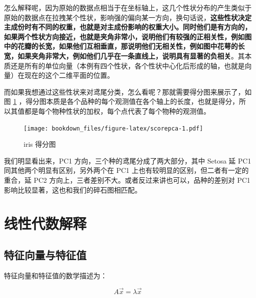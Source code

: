 \documentclass[
]{krantz}
\makeatletter
\newenvironment{Shaded}{\begin{snugshade}}{\end{snugshade}}
\newcommand{\AttributeTok}[1]{\textcolor[rgb]{0.77,0.63,0.00}{#1}}
\newcommand{\ConstantTok}[1]{\textcolor[rgb]{0.00,0.00,0.00}{#1}}
\newcommand{\FunctionTok}[1]{\textcolor[rgb]{0.00,0.00,0.00}{#1}}
\newcommand{\NormalTok}[1]{#1}
\newcommand{\SpecialCharTok}[1]{\textcolor[rgb]{0.00,0.00,0.00}{#1}}
\newenvironment{kframe}{%
\medskip{}
\setlength{\fboxsep}{.8em}
 \def\at@end@of@kframe{}%
 \ifinner\ifhmode%
  \def\at@end@of@kframe{\end{minipage}}%
  \begin{minipage}{\columnwidth}%
 \fi\fi%
 \def\FrameCommand##1{\hskip\@totalleftmargin \hskip-\fboxsep
 \colorbox{shadecolor}{##1}\hskip-\fboxsep
     \hskip-\linewidth \hskip-\@totalleftmargin \hskip\columnwidth}%
 \MakeFramed {\advance\hsize-\width
   \@totalleftmargin\z@ \linewidth\hsize
   \@setminipage}}%
 {\par\unskip\endMakeFramed%
 \at@end@of@kframe}
\renewenvironment{Shaded}{\begin{kframe}}{\end{kframe}}
\makeatother
\begin{document}
怎么解释呢，因为原始的数据点相当于在坐标轴上，这几个性状分布的产生类似于原始的数据点在拉拽某个性状，影响强的偏向某一方向，换句话说，\textbf{这些性状决定主成份时有不同的权重，也就是对主成份影响的权重大小。同时他们是有方向的，如果两个性状方向接近，也就是夹角非常小，说明他们有较强的正相关性，例如图中的花瓣的长宽，如果他们互相垂直，那说明他们无相关性，例如图中花萼的长宽，如果夹角非常大，例如他们几乎在一条直线上，说明具有显著的负相关}。其本质还是所有的单位向量（本例有四个性状，各个性状中心化后形成的轴，也就是向量）在现在的这个二维平面的位置。

而如果我想通过这些性状来对鸢尾分类，怎么看呢？那就需要得分图来展示了，如图 \ref{fig:scorepca} ，得分图本质是各个品种的每个观测值在各个轴上的长度，也就是得分，所以其值都是每个物种性状的加权，每个点代表了每个物种的观测值。

\begin{Shaded}
\end{Shaded}

\begin{figure}
\centering
\texttt{[image: bookdown\_files/figure-latex/scorepca-1.pdf]}
\caption{\label{fig:scorepca}iris 得分图}
\end{figure}

我们明显看出来，PC1 方向，三个种的鸢尾分成了两大部分，其中 Setosa 延 PC1 同其他两个明显有区别，另外两个在 PC1 上也有较明显的区别，但二者有一定的重合，延 PC2 方向上，三者差别不大。或者反过来讲也可以，品种的差别对 PC1 影响比较显著，这也和我们的碎石图相匹配。

\hypertarget{alge-pca}{%
\section{线性代数解释}\label{alge-pca}}

\hypertarget{egi-pca}{%
\subsection{特征向量与特征值}\label{egi-pca}}

特征向量和特征值的数学描述为：

\begin{equation}
A \vec{x} = \lambda \vec{x}
\label{eq:eign}
\end{equation}
\end{document}
